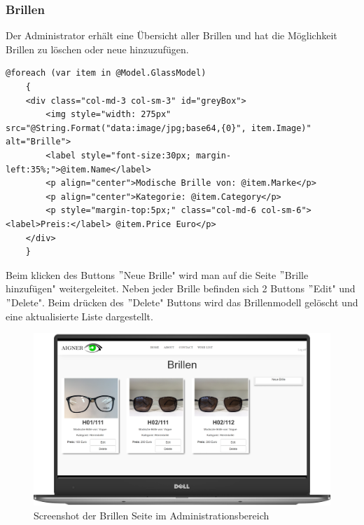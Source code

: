 \subsubsection{Brillen}
Der Administrator erhält eine Übersicht aller Brillen und hat die Möglichkeit Brillen zu löschen oder neue hinzuzufügen.
\begin{lstlisting}
@foreach (var item in @Model.GlassModel)
    {
    <div class="col-md-3 col-sm-3" id="greyBox">
        <img style="width: 275px" src="@String.Format("data:image/jpg;base64,{0}", item.Image)" alt="Brille">
        <label style="font-size:30px; margin-left:35%;">@item.Name</label>
        <p align="center">Modische Brille von: @item.Marke</p>
        <p align="center">Kategorie: @item.Category</p>
        <p style="margin-top:5px;" class="col-md-6 col-sm-6"><label>Preis:</label> @item.Price Euro</p>
    </div>
    }
\end{lstlisting}

Beim klicken des Buttons $"$Neue Brille" wird man auf die Seite $"$Brille hinzufügen" weitergeleitet. Neben jeder Brille befinden sich 2 Buttons $"$Edit" und $"$Delete". Beim drücken des $"$Delete" Buttons wird das Brillenmodell gelöscht und eine aktualisierte Liste dargestellt.

\begin{figure}[H]
\begin{center}
	\includegraphics[scale=.2]{images/AdminBrillen.png}
\end{center}
	\caption{ Screenshot der Brillen Seite im Administrationsbereich}
	\label{fig:sample}
\end{figure}
 

